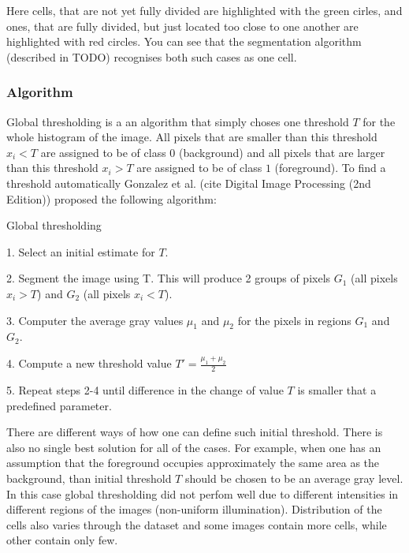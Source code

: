 Here cells, that are not yet fully divided are highlighted with the green cirles, and ones, that are fully divided, but just located too close to one another are highlighted with red circles. You can see that the segmentation algorithm (described in TODO) recognises both such cases as one cell.

\subsubsection{Algorithm}

Global thresholding is a an algorithm that simply choses one threshold $T$ for the whole histogram of the image. All pixels that are smaller than this threshold $x_i < T$ are assigned to be of class $0$ (background) and all pixels that are larger than this threshold $x_i > T$ are assigned to be of class $1$ (foreground). To find a threshold automatically Gonzalez et al. (cite Digital Image Processing (2nd Edition)) proposed the following algorithm:

\begin{algorithm}
\caption{Global thresholding}\label{alg:global-thresholding}
\begin{algorithmic}
\item 1. Select an initial estimate for $T$.
\item 2. Segment the image using T. This will produce 2 groups of pixels $G_1$ (all pixels $x_i > T$) and $G_2$ (all pixels $x_i < T$).  
\item 3. Computer the average gray values $\mu_1$ and $\mu_2$ for the pixels in  regions $G_1$ and $G_2$.
\item 4. Compute a new threshold value 
    $T' = \frac{\mu_1 + \mu_2}{2}$
\item 5. Repeat steps 2-4 until difference in the change of value $T$ is smaller that a predefined parameter.
\end{algorithmic}
\end{algorithm}

There are different ways of how one can define such initial threshold. There is also no single best solution for all of the cases. For example, when one has an assumption that the foreground occupies approximately the same area as the background, than initial threshold $T$ should be chosen to be an average gray level. In this case global thresholding did not perfom well due to different intensities in different regions of the images (non-uniform illumination). Distribution of the cells also varies through the dataset and some images contain more cells, while other contain only few.


